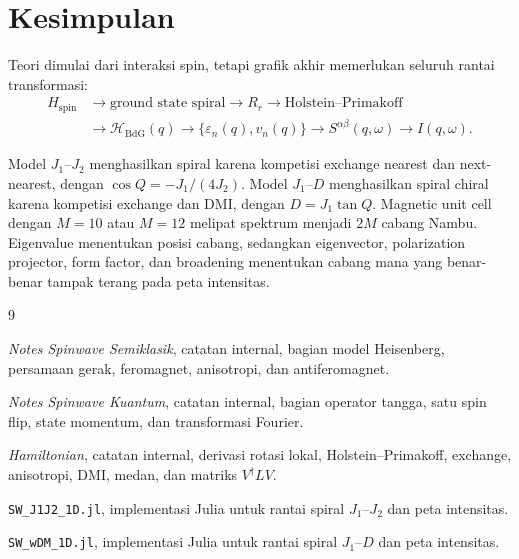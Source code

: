 \documentclass[11pt,a4paper]{article}
\newcommand{\mH}{\mathcal H}
\begin{document}
\section{Kesimpulan}

Teori dimulai dari interaksi spin, tetapi grafik akhir memerlukan seluruh rantai transformasi:
\begin{equation}
\boxed{
\begin{aligned}
H_{\mathrm{spin}}
&\longrightarrow
\text{ground state spiral}
\longrightarrow R_r
\longrightarrow
\text{Holstein--Primakoff}\\
&\longrightarrow
\mH_{\mathrm{BdG}}(q)
\longrightarrow
\{\varepsilon_n(q),v_n(q)\}
\longrightarrow
S^{\alpha\beta}(q,\omega)
\longrightarrow I(q,\omega).
\end{aligned}}
\end{equation}

Model $J_1$--$J_2$ menghasilkan spiral karena kompetisi exchange nearest dan next-nearest, dengan $\cos Q=-J_1/(4J_2)$. Model $J_1$--$D$ menghasilkan spiral chiral karena kompetisi exchange dan DMI, dengan $D=J_1\tan Q$. Magnetic unit cell dengan $M=10$ atau $M=12$ melipat spektrum menjadi $2M$ cabang Nambu. Eigenvalue menentukan posisi cabang, sedangkan eigenvector, polarization projector, form factor, dan broadening menentukan cabang mana yang benar-benar tampak terang pada peta intensitas.

\begin{thebibliography}{9}

\emph{Notes Spinwave Semiklasik}, catatan internal, bagian model Heisenberg, persamaan gerak, feromagnet, anisotropi, dan antiferomagnet.

\emph{Notes Spinwave Kuantum}, catatan internal, bagian operator tangga, satu spin flip, state momentum, dan transformasi Fourier.

\emph{Hamiltonian}, catatan internal, derivasi rotasi lokal, Holstein--Primakoff, exchange, anisotropi, DMI, medan, dan matriks $V^\dagger LV$.

\texttt{SW\_J1J2\_1D.jl}, implementasi Julia untuk rantai spiral $J_1$--$J_2$ dan peta intensitas.

\texttt{SW\_wDM\_1D.jl}, implementasi Julia untuk rantai spiral $J_1$--$D$ dan peta intensitas.

\end{thebibliography}
\end{document}
